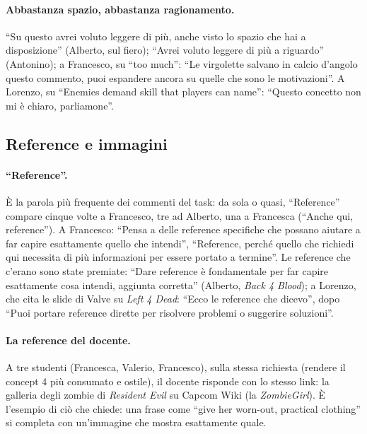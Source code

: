 \paragraph{Abbastanza spazio, abbastanza ragionamento.} ``Su questo avrei
voluto leggere di più, anche visto lo spazio che hai a disposizione''
(Alberto, sul fiero); ``Avrei voluto leggere di più a riguardo'' (Antonino);
a Francesco, su ``too much'': ``Le virgolette salvano in calcio d'angolo
questo commento, puoi espandere ancora su quelle che sono le motivazioni''. A
Lorenzo, su ``Enemies demand skill that players can name'': ``Questo
concetto non mi è chiaro, parliamone''.

\subsection{Reference e immagini}
\label{rv:t6:sec:reference}

\paragraph{``Reference''.} È la parola più frequente dei commenti del task:
da sola o quasi, ``Reference'' compare cinque volte a Francesco, tre ad
Alberto, una a Francesca (``Anche qui, reference''). A Francesco: ``Pensa a
delle reference specifiche che possano aiutare a far capire esattamente
quello che intendi'', ``Reference, perché quello che richiedi qui necessita
di più informazioni per essere portato a termine''. Le reference che c'erano
sono state premiate: ``Dare reference è fondamentale per far capire
esattamente cosa intendi, aggiunta corretta'' (Alberto, \emph{Back 4 Blood});
a Lorenzo, che cita le slide di Valve su \emph{Left 4 Dead}: ``Ecco le
reference che dicevo'', dopo ``Puoi portare reference dirette per risolvere
problemi o suggerire soluzioni''.

\paragraph{La reference del docente.} A tre studenti (Francesca, Valerio,
Francesco), sulla stessa richiesta (rendere il concept 4 più consumato e
ostile), il docente risponde con lo stesso link: la galleria degli zombie di
\emph{Resident Evil} su Capcom Wiki (la \emph{ZombieGirl}). È l'esempio di
ciò che chiede: una frase come ``give her worn-out, practical clothing'' si
completa con un'immagine che mostra esattamente quale.


